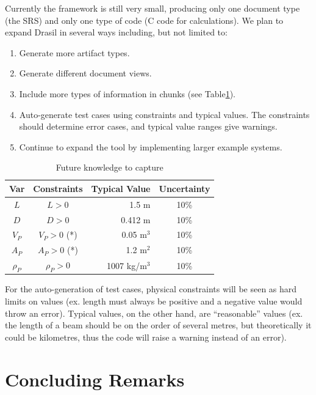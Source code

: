 \documentclass{sig-alternate-05-2015}
\newcommand{\lss}{Drasil}
\begin{document}
Currently the framework is still very small, producing only one document type
(the SRS) and only one type of code (C code for calculations). We plan to expand
\lss{} in several ways including, but not limited to:

\begin{enumerate}
\setlength{\itemsep}{0pt}
\setlength{\parskip}{0pt}
\setlength{\parsep}{0pt}
\item Generate more artifact types. %
\item Generate different document views. %
\item Include more types of information in chunks (see Table\ref{tab:pcm}).
\item Auto-generate test cases using constraints and typical values. The
  constraints should determine error cases, and typical value ranges give
  warnings.
\item Continue to expand the tool by implementing larger example systems.
\end{enumerate}

\begin{table} \label{tab:pcm}
\centering
\caption{Future knowledge to capture}
\begin{tabular}{|c|c|r|c|} \hline
\textbf{Var} & \textbf{Constraints} & \textbf{Typical Value} & \textbf{Uncertainty}\\ \hline
$L$ & $L > 0$ & 1.5 m & 10\% \\ \hline
$D$ & $D > 0$ & 0.412 m & 10\% \\ \hline
$V_P$ & $V_P > 0$ (*)	& 0.05 m$^3$	& 10\% \\ \hline
$A_P$ & $A_P > 0$ (*)	& 1.2 m$^2$	& 10\% \\ \hline
$\rho_P$ & $\rho_P > 0$	& 1007 kg/m$^3$	& 10\% \\
\hline\end{tabular}
\end{table}

For the auto-generation of test cases, physical constraints will be seen as hard
limits on values (ex. length must always be positive and a negative value would
throw an error). Typical values, on the other hand, are ``reasonable'' values
(ex. the length of a beam should be on the order of several metres, but
theoretically it could be kilometres, thus the code will raise a warning instead
of an error).

    
\section{Concluding Remarks} \label{sec:conclusion}
\end{document}
